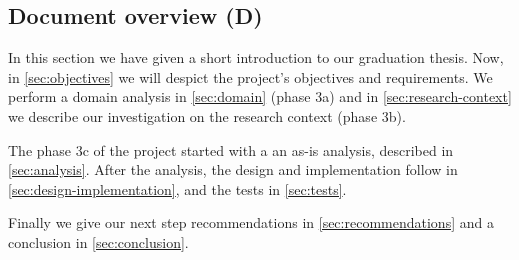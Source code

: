 
\subsection{Document overview (D)}
In this section we have given a short introduction to our graduation thesis.
Now, in \autoref{sec:objectives} we will despict the project's objectives and requirements.
We perform a domain analysis in \autoref{sec:domain} (phase 3a) and in \autoref{sec:research-context} we describe our investigation on the research context (phase 3b).

The phase 3c of the project started with a an as-is analysis, described in \autoref{sec:analysis}.
After the analysis, the design and implementation follow in \autoref{sec:design-implementation}, and the tests in \autoref{sec:tests}.

Finally we give our next step recommendations in \autoref{sec:recommendations} and a conclusion in \autoref{sec:conclusion}.